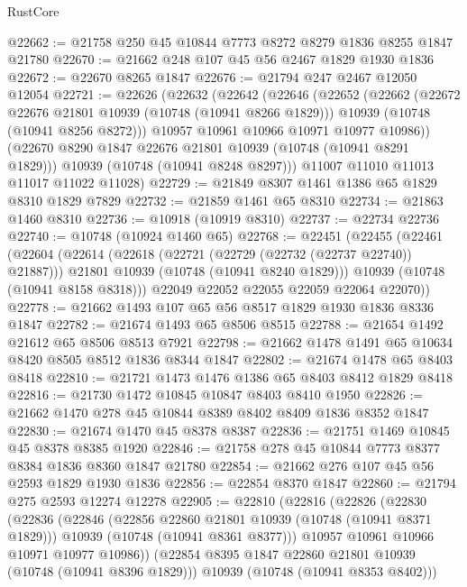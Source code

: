 \begin{lexlean}{RustCore}
\begin{coremodule}
@22662 := @21758 @250 @45 @10844 @7773 @8272 @8279 @1836 @8255 @1847 @21780
@22670 := @21662 @248 @107 @45 @56 @2467 @1829 @1930 @1836
@22672 := @22670 @8265 @1847
@22676 := @21794 @247 @2467 @12050 @12054
@22721 := @22626
    (@22632
      (@22642
        (@22646
          (@22652
            (@22662
              (@22672 @22676 @21801 @10939 (@10748 (@10941 @8266 @1829)))
              @10939
              (@10748 (@10941 @8256 @8272)))
            @10957
            @10961
            @10966
            @10971
            @10977
            @10986))
        (@22670 @8290 @1847 @22676 @21801 @10939 (@10748 (@10941 @8291 @1829)))
        @10939
        (@10748 (@10941 @8248 @8297)))
      @11007
      @11010
      @11013
      @11017
      @11022
      @11028)
@22729 := @21849 @8307 @1461 @1386 @65 @1829 @8310 @1829 @7829
@22732 := @21859 @1461 @65 @8310
@22734 := @21863 @1460 @8310
@22736 := @10918 (@10919 @8310)
@22737 := @22734 @22736
@22740 := @10748 (@10924 @1460 @65)
@22768 := @22451
    (@22455
      (@22461
        (@22604
          (@22614
            (@22618 (@22721 (@22729 (@22732 (@22737 @22740)) @21887)))
            @21801
            @10939
            (@10748 (@10941 @8240 @1829)))
          @10939
          (@10748 (@10941 @8158 @8318)))
        @22049
        @22052
        @22055
        @22059
        @22064
        @22070))
@22778 := @21662 @1493 @107 @65 @56 @8517 @1829 @1930 @1836 @8336 @1847
@22782 := @21674 @1493 @65 @8506 @8515
@22788 := @21654 @1492 @21612 @65 @8506 @8513 @7921
@22798 := @21662 @1478 @1491 @65 @10634 @8420 @8505 @8512 @1836 @8344 @1847
@22802 := @21674 @1478 @65 @8403 @8418
@22810 := @21721 @1473 @1476 @1386 @65 @8403 @8412 @1829 @8418
@22816 := @21730 @1472 @10845 @10847 @8403 @8410 @1950
@22826 := @21662 @1470 @278 @45 @10844 @8389 @8402 @8409 @1836 @8352 @1847
@22830 := @21674 @1470 @45 @8378 @8387
@22836 := @21751 @1469 @10845 @45 @8378 @8385 @1920
@22846 := @21758 @278 @45 @10844 @7773 @8377 @8384 @1836 @8360 @1847 @21780
@22854 := @21662 @276 @107 @45 @56 @2593 @1829 @1930 @1836
@22856 := @22854 @8370 @1847
@22860 := @21794 @275 @2593 @12274 @12278
@22905 := @22810
    (@22816
      (@22826
        (@22830
          (@22836
            (@22846
              (@22856 @22860 @21801 @10939 (@10748 (@10941 @8371 @1829)))
              @10939
              (@10748 (@10941 @8361 @8377)))
            @10957
            @10961
            @10966
            @10971
            @10977
            @10986))
        (@22854 @8395 @1847 @22860 @21801 @10939 (@10748 (@10941 @8396 @1829)))
        @10939
        (@10748 (@10941 @8353 @8402)))

\end{coremodule}
\end{lexlean}

